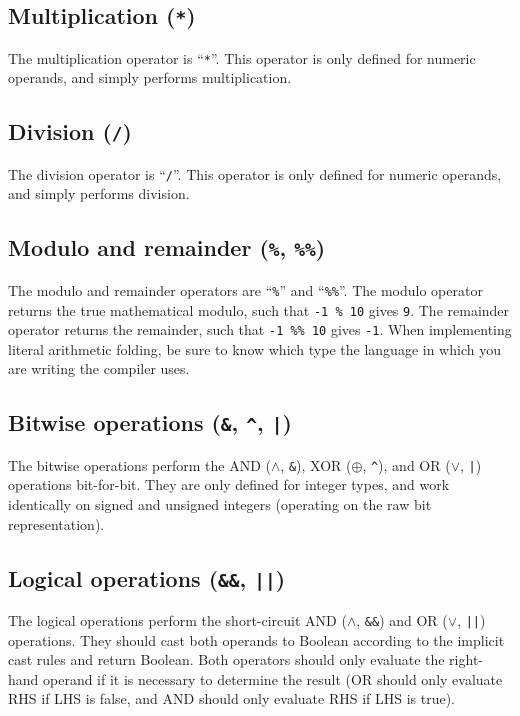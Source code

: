 \documentclass{article}
\begin{document}
\subsection{Multiplication (\texttt{*})}
\label{sub:operators:mul}
The multiplication operator is ``\texttt{*}''. This operator is only defined for
numeric operands, and simply performs multiplication.

\subsection{Division (\texttt{/})}
\label{sub:operators:mul}
The division operator is ``\texttt{/}''. This operator is only defined for
numeric operands, and simply performs division.

\subsection{Modulo and remainder (\texttt{\%}, \texttt{\%\%})}
\label{sub:operators:modrem}
The modulo and remainder operators are ``\texttt{\%}'' and ``\texttt{\%\%}''.
The modulo operator returns the true mathematical modulo, such that
\texttt{-1~\%~10} gives \texttt{9}. The remainder operator returns the
remainder, such that \texttt{-1~\%\%~10} gives \texttt{-1}. When implementing
literal arithmetic folding, be sure to know which type the language in which
you are writing the compiler uses.

\subsection{Bitwise operations (\texttt{\&}, \texttt{\^}, \texttt{|})}
\label{sub:operators:bitwise}
The bitwise operations perform the AND ($\land$, \texttt{\&}),
XOR ($\oplus$, \texttt{\^{}}), and OR ($\lor$, \texttt{|}) operations
bit-for-bit. They are only defined for integer types, and work identically on
signed and unsigned integers (operating on the raw bit representation).

\subsection{Logical operations (\texttt{\&\&}, \texttt{||})}
\label{sub:operators:logical}
The logical operations perform the short-circuit AND ($\land$, \texttt{\&\&})
and OR ($\lor$, \texttt{||}) operations. They should cast both operands to
Boolean according to the implicit cast rules and return Boolean. Both
operators should only evaluate the right-hand operand if it is necessary to
determine the result (OR should only evaluate RHS if LHS is false, and AND
should only evaluate RHS if LHS is true).
\end{document}
